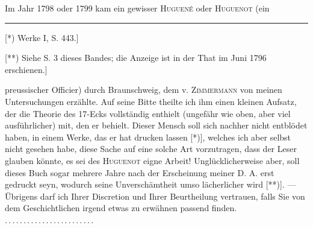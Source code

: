 Im Jahr 1798 oder 1799 kam ein gewisser \textsc{Huguené} oder \textsc{Huguenot} (ein
\par\smallskip\noindent\rule{.25\linewidth}{.4pt}\par\smallskip
{\small\noindent\hspace*{\parindent}[*) Werke I, S. 443.]\par
\noindent\hspace*{\parindent}[**) Siehe S. 3 dieses Bandes; die Anzeige ist in der That im Juni 1796 erschienen.]\par}
\clearpage
{}
\noindent preussischer Officier) durch Braunschweig, dem v. \textsc{Zimmermann} von meinen
Untersuchungen erzählte. Auf seine Bitte theilte ich ihm einen kleinen Aufsatz, der die Theorie
des 17-Ecks vollständig enthielt (ungefähr wie oben, aber viel ausführlicher) mit, den er behielt.
Dieser Mensch soll sich nachher nicht entblödet haben, in einem Werke, das er hat drucken lassen
[*)], welches ich aber selbst nicht gesehen habe, diese Sache auf eine solche Art vorzutragen,
dass der Leser glauben könnte, es sei des \textsc{Huguenot} eigne Arbeit! Unglücklicherweise aber,
soll dieses Buch sogar mehrere Jahre nach der Erscheinung meiner D. A. erst gedruckt seyn,
wodurch seine Unverschämtheit umso lächerlicher wird [**)]. — Übrigens darf ich Ihrer Discretion
und Ihrer Beurtheilung vertrauen, falls Sie von dem Geschichtlichen irgend etwas zu erwähnen
passend finden. .\,.\,.\,.\,.\,.\,.\,.\,.\,.\,.\,.\,.\,.\,.\,.\,.\,.\,.\,.\,.\,.\,.\,.

